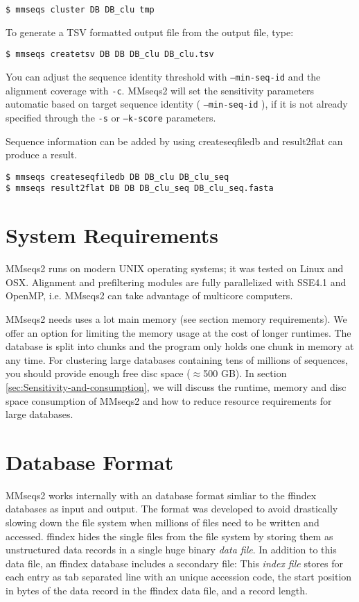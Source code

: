 \documentclass[11pt,a4paper]{scrreprt}
\begin{document}
\begin{verbatim}
$ mmseqs cluster DB DB_clu tmp
\end{verbatim}


To generate a TSV formatted output file from the output file, type:
\begin{verbatim}
$ mmseqs createtsv DB DB DB_clu DB_clu.tsv
\end{verbatim}


You can adjust the sequence identity threshold with \texttt{--min-seq-id} and the alignment coverage with \texttt{-c}. MMseqs2 will set the sensitivity parameters automatic based on target sequence identity ( \texttt{--min-seq-id} ), if it is not already specified through the \texttt{-s} or \texttt{--k-score} parameters.


Sequence information can be added by using createseqfiledb and result2flat can produce a result.


\begin{verbatim}
$ mmseqs createseqfiledb DB DB_clu DB_clu_seq
$ mmseqs result2flat DB DB DB_clu_seq DB_clu_seq.fasta
\end{verbatim}
\section{System Requirements}
MMseqs2 runs on modern UNIX operating systems; it was tested on Linux and OSX. Alignment and prefiltering modules are fully parallelized with SSE4.1 and OpenMP, i.e. MMseqs2 can take advantage of multicore computers. 


MMseqs2 needs uses a lot main memory (see section memory requirements). We offer an option for limiting the memory usage at the cost of longer runtimes. The database is split into chunks and the program only holds one chunk in memory at any time. For clustering large databases containing tens of millions of sequences, you should provide enough free disc space ($\approx$500 GB). In section \ref{sec:Sensitivity-and-consumption}, we will discuss the runtime, memory and disc space consumption of MMseqs2 and how to reduce resource requirements for large databases.
\section{Database Format}
MMseqs2 works internally with an database format simliar to the ffindex databases as input and output. The format was developed to avoid drastically slowing down the file system when millions of files need to be written and accessed. ffindex hides the single files from the file system by storing them as unstructured data records in a single huge binary \emph{data file}. In addition to this data file, an ffindex database includes a secondary file: This \emph{index file} stores for each entry as tab separated line with an unique accession code, the start position in bytes of the data record in the ffindex data file, and a record length.
\end{document}
